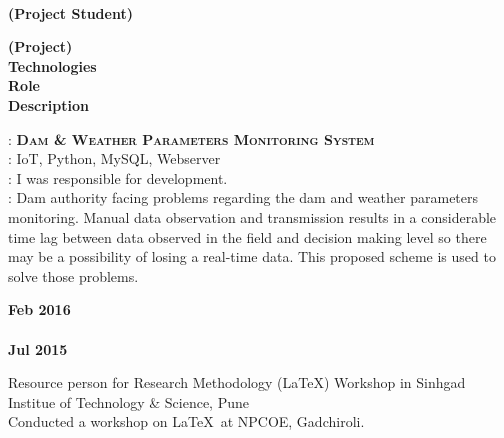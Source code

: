 \documentclass[a4paper,11pt]{memoir} %
\begin{document}
\begin{minipage}[t]{0.25\columnwidth}
\end{minipage}
\hfill
\begin{minipage}[t]{0.75\columnwidth}
\begin{center}
\\
\textbf{(Project Student)}
\end{center}
\end{minipage}
\Sep

\begin{minipage}[t]{0.25\columnwidth}
\textbf{(Project)}\\
\textbf{Technologies}\\
\textbf{Role}\\
\textbf{Description}
\end{minipage}
\hfill
\begin{minipage}[t]{0.75\columnwidth}
: \textbf{\textsc{Dam \& Weather Parameters Monitoring System}}\\
: IoT, Python, MySQL, Webserver\\
: I was responsible for development.\\
: Dam authority facing problems regarding the dam and weather parameters monitoring. 
Manual data observation and transmission results in a considerable time lag between data observed in the field and decision making level so there may be a possibility of losing a real-time data. 
This proposed scheme is used to solve those problems.
\end{minipage}


\Sep %
\begin{minipage}[t]{0.15\columnwidth}
\textbf{Feb 2016}\\
\\
\textbf{Jul 2015} 
\end{minipage}
\hfill
\begin{minipage}[t]{0.85\columnwidth}
Resource person for Research Methodology (\LaTeX) Workshop in 
Sinhgad Institue of Technology \& Science, Pune\\
Conducted a workshop on \LaTeX \, at NPCOE, Gadchiroli.
\end{minipage}
\end{document}
